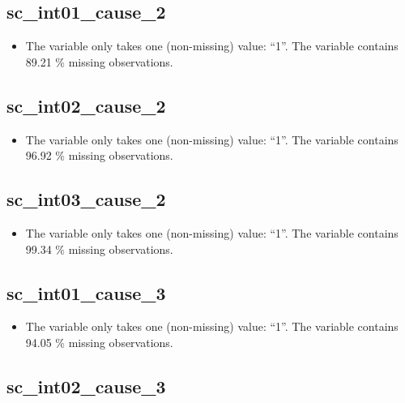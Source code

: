 \documentclass[
  letterpaper,
  DIV=11,
  numbers=noendperiod]{scrartcl}
\providecommand{\tightlist}{%
  \setlength{\itemsep}{0pt}\setlength{\parskip}{0pt}}
\begin{document}
\fullline

\subsection{sc\_int01\_cause\_2}\label{sc_int01_cause_2}

\begin{itemize}
\tightlist
\item
  The variable only takes one (non-missing) value: ``1''. The variable
  contains 89.21 \% missing observations.
\end{itemize}

\fullline

\subsection{sc\_int02\_cause\_2}\label{sc_int02_cause_2}

\begin{itemize}
\tightlist
\item
  The variable only takes one (non-missing) value: ``1''. The variable
  contains 96.92 \% missing observations.
\end{itemize}

\fullline

\subsection{sc\_int03\_cause\_2}\label{sc_int03_cause_2}

\begin{itemize}
\tightlist
\item
  The variable only takes one (non-missing) value: ``1''. The variable
  contains 99.34 \% missing observations.
\end{itemize}

\fullline

\subsection{sc\_int01\_cause\_3}\label{sc_int01_cause_3}

\begin{itemize}
\tightlist
\item
  The variable only takes one (non-missing) value: ``1''. The variable
  contains 94.05 \% missing observations.
\end{itemize}

\fullline

\subsection{sc\_int02\_cause\_3}\label{sc_int02_cause_3}
\end{document}
